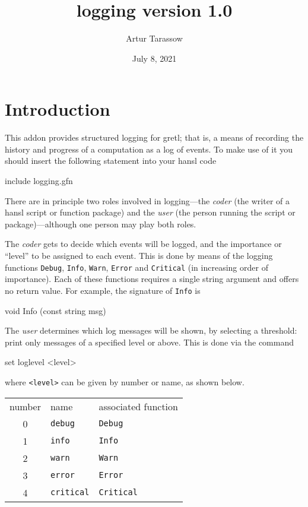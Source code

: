 \documentclass{article}
\begin{document}
\setlength{\parindent}{0pt}
\setlength{\parskip}{1ex}

\newcommand{\argname}[1]{\textsl{#1}}

\title{logging version 1.0}
\author{Artur Tarassow}
\date{July 8, 2021}
\maketitle

\section{Introduction}

This addon provides structured logging for gretl; that is, a means of
recording the history and progress of a computation as a log of
events. To make use of it you should insert the following statement
into your hansl code
\begin{code}
include logging.gfn
\end{code}

There are in principle two roles involved in logging---the
\textit{coder} (the writer of a hansl script or function package) and
the \textit{user} (the person running the script or
package)---although one person may play both roles.

The \textit{coder} gets to decide which events will be logged, and the
importance or ``level'' to be assigned to each event. This is done by
means of the logging functions \texttt{Debug}, \texttt{Info},
\texttt{Warn}, \texttt{Error} and \texttt{Critical} (in increasing
order of importance).  Each of these functions requires a single
string argument and offers no return value. For example, the signature
of \texttt{Info} is
\begin{code}
void Info (const string msg)
\end{code}

The \textit{user} determines which log messages will be shown, by
selecting a threshold: print only messages of a specified level or
above.  This is done via the command
\begin{code}
set loglevel <level>
\end{code}
where \verb|<level>| can be given by number or name, as shown below.

\begin{center}
  \begin{tabular}{cll}
    number & name & associated function \\[4pt]
    0 & \texttt{debug} & \texttt{Debug}\\
    1 & \texttt{info} & \texttt{Info}\\
    2 & \texttt{warn} & \texttt{Warn}\\
    3 & \texttt{error} & \texttt{Error}\\
    4 & \texttt{critical} & \texttt{Critical}
  \end{tabular}
\end{center}
\end{document}
